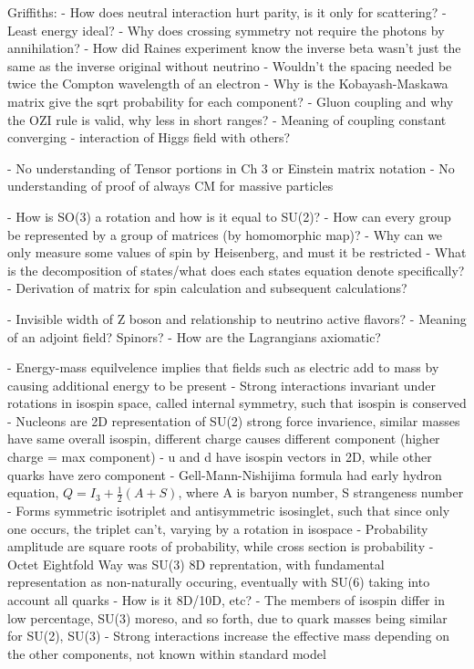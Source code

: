 \documentclass[11 pt, twoside]{article}
\begin{document}
Griffiths:
- How does neutral interaction hurt parity, is it only for scattering?
- Least energy ideal?
- Why does crossing symmetry not require the photons by annihilation?
- How did Raines experiment know the inverse beta wasn't just the same as the inverse original without neutrino
- Wouldn't the spacing needed be twice the Compton wavelength of an electron
- Why is the Kobayash-Maskawa matrix give the sqrt probability for each component?
- Gluon coupling and why the OZI rule is valid, why less in short ranges?
- Meaning of coupling constant converging - interaction of Higgs field with others?

- No understanding of Tensor portions in Ch 3 or Einstein matrix notation
- No understanding of proof of always CM for massive particles

- How is SO(3) a rotation and how is it equal to SU(2)?
- How can every group be represented by a group of matrices (by homomorphic map)?
- Why can we only measure some values of spin by Heisenberg, and must it be restricted
- What is the decomposition of states/what does each states equation denote specifically?
- Derivation of matrix for spin calculation and subsequent calculations?

- Invisible width of Z boson and relationship to neutrino active flavors?
- Meaning of an adjoint field? Spinors?
- How are the Lagrangians axiomatic?

- Energy-mass equilvelence implies that fields such as electric add to mass by causing additional energy to be present
- Strong interactions invariant under rotations in isospin space, called internal symmetry, such that isospin is conserved
	- Nucleons are 2D representation of SU(2) strong force invarience, similar masses have same overall isospin, different charge causes different component (higher charge = max component)
	- u and d have isospin vectors in 2D, while other quarks have zero component
	- Gell-Mann-Nishijima formula had early hydron equation, $Q = I_3 + \frac{1}{2}(A + S)$, where A is baryon number, S strangeness number
	- Forms symmetric isotriplet and antisymmetric isosinglet, such that since only one occurs, the triplet can't, varying by a rotation in isospace
	- Probability amplitude are square roots of probability, while cross section is probability
	- Octet Eightfold Way was SU(3) 8D reprentation, with fundamental representation as non-naturally occuring, eventually with SU(6) taking into account all quarks
		- How is it 8D/10D, etc?
		- The members of isospin differ in low percentage, SU(3) moreso, and so forth, due to quark masses being similar for SU(2), SU(3)
- Strong interactions increase the effective mass depending on the other components, not known within standard model
\end{document}

